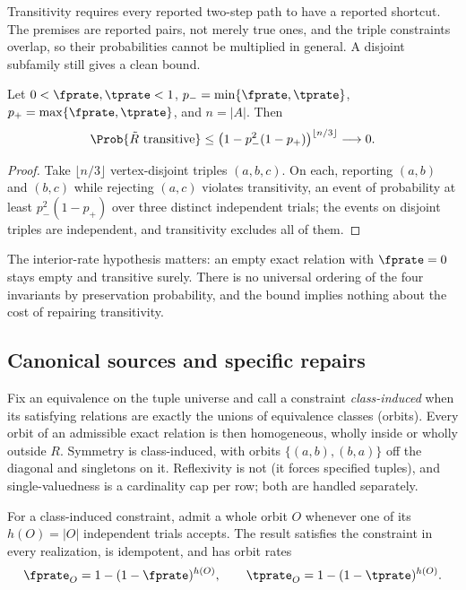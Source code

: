 Transitivity requires every reported two-step path to have a reported shortcut.
The premises are reported pairs, not merely true ones, and the triple constraints
overlap, so their probabilities cannot be multiplied in general. A disjoint
subfamily still gives a clean bound.

\begin{theorem}
\label{thm:rel-transitive}
Let $0 < \fprate, \tprate < 1$, $p_- = \min\{\fprate, \tprate\}$, $p_+ =
\max\{\fprate, \tprate\}$, and $n = |A|$. Then
\[
  \Prob{\tilde R \text{ transitive}}
  \le \bigl(1 - p_-^2 (1 - p_+)\bigr)^{\lfloor n/3 \rfloor}
  \longrightarrow 0 .
\]
\end{theorem}

\begin{proof}
Take $\lfloor n/3 \rfloor$ vertex-disjoint triples $(a, b, c)$. On each, reporting
$(a, b)$ and $(b, c)$ while rejecting $(a, c)$ violates transitivity, an event of
probability at least $p_-^2 (1 - p_+)$ over three distinct independent trials;
the events on disjoint triples are independent, and transitivity excludes all of
them.
\end{proof}

The interior-rate hypothesis matters: an empty exact relation with $\fprate = 0$
stays empty and transitive surely. There is no universal ordering of the four
invariants by preservation probability, and the bound implies nothing about the
cost of repairing transitivity.

\subsection*{Canonical sources and specific repairs}

Fix an equivalence on the tuple universe and call a constraint
\emph{class-induced} when its satisfying relations are exactly the unions of
equivalence classes (orbits). Every orbit of an admissible exact relation is then
homogeneous, wholly inside or wholly outside $R$. Symmetry is class-induced, with
orbits $\{(a, b), (b, a)\}$ off the diagonal and singletons on it. Reflexivity is
not (it forces specified tuples), and single-valuedness is a cardinality cap per
row; both are handled separately.

\begin{theorem}
\label{thm:rel-or-closure}
For a class-induced constraint, admit a whole orbit $O$ whenever one of its
$h(O) = |O|$ independent trials accepts. The result satisfies the constraint in
every realization, is idempotent, and has orbit rates
\[
  \fprate_O = 1 - (1 - \fprate)^{h(O)},
  \qquad
  \tprate_O = 1 - (1 - \tprate)^{h(O)}.
\]
\end{theorem}

